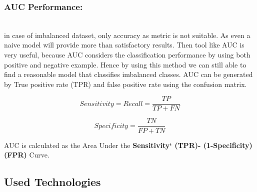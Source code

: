 \subsubsection{AUC Performance:}\hspace*{\fill} \\
in case of imbalanced dataset, only accuracy as metric is not suitable. As even a naive model will provide more than satisfactory results. Then tool like AUC is very useful, because AUC considers the classification performance by using both positive and negative example. Hence by using this method we can still able to find a reasonable model that classifies imbalanced classes. AUC can be generated by True positive rate (TPR) and false positive rate using the confusion matrix. 



\begin{equation} \label{eq:Sensitivity}
    Sensitivity = Recall = \frac{TP}{TP+FN}
\end{equation}

\begin{equation} \label{eq: Specificity}
    Specificity = \frac{TN}{FP+TN}
\end{equation}

AUC is calculated as the Area Under the \textbf{Sensitivity` (TPR)- (1-Specificity)(FPR)} Curve.


\subsection{Used Technologies}\label{subsec:used-technologies}
